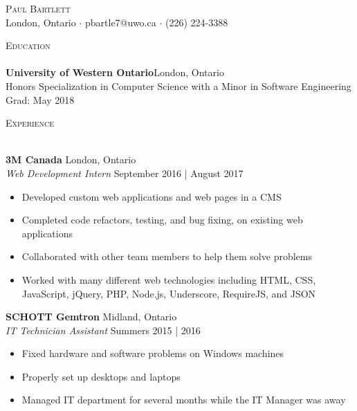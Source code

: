 \documentclass[a4paper]{article}
\newcommand{\lineunder} {
    \vspace*{-8pt} \\
    \hspace*{-18pt} \hrulefill \\
}
\newcommand{\header} [1] {
    {\hspace*{-18pt}\vspace*{6pt} \textsc{#1}}
    \vspace*{-6pt} \lineunder
}
\begin{document}
\vspace*{-40pt}

\vspace*{-10pt}
\begin{center}
	{\Huge \scshape {Paul Bartlett}}\\
	London, Ontario $\cdot$ pbartle7@uwo.ca $\cdot$ (226) 224-3388\\
\end{center}

\vspace*{2mm}

\header{Education}
\textbf{University of Western Ontario}\hfill London, Ontario\\
Honors Specialization in Computer Science with a Minor in Software Engineering \hfill Grad: May 2018\\
\vspace{2mm}

\vspace*{2mm}

\header{Experience}
\vspace{1mm}

\textbf{3M Canada} \hfill London, Ontario\\
\textit{Web Development Intern} \hfill September 2016 | August 2017\\
\vspace{-1mm}
\begin{itemize} \itemsep 1pt
	\item Developed custom web applications and web pages in a CMS
	\item Completed code refactors, testing, and bug fixing, on existing web applications
	\item Collaborated with other team members to help them solve problems
	\item Worked with many different web technologies including HTML, CSS, JavaScript, jQuery, PHP, Node.js, Underscore, RequireJS, and JSON
\end{itemize}

\textbf{SCHOTT Gemtron} \hfill Midland, Ontario\\
\textit{IT Technician Assistant} \hfill Summers 2015 | 2016\\
\vspace{-1mm}
\begin{itemize} \itemsep 1pt
	\item Fixed hardware and software problems on Windows machines
	\item Properly set up desktops and laptops
	\item Managed IT department for several months while the IT Manager was away
\end{itemize}
\end{document}

